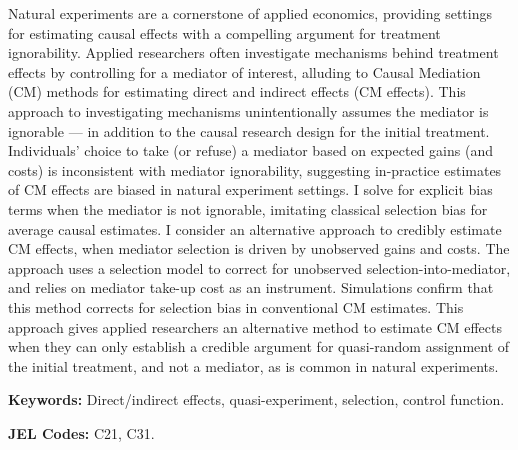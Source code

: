 \noindent
Natural experiments are a cornerstone of applied economics, providing settings for estimating causal effects with a compelling argument for treatment ignorability.
Applied researchers often investigate mechanisms behind treatment effects by controlling for a mediator of interest, alluding to Causal Mediation (CM) methods for estimating direct and indirect effects (CM effects).
This approach to investigating mechanisms unintentionally assumes the mediator is ignorable --- in addition to the causal research design for the initial treatment.
Individuals' choice to take (or refuse) a mediator based on expected gains (and costs) is inconsistent with mediator ignorability, suggesting in-practice estimates of CM effects are biased in natural experiment settings.
I solve for explicit bias terms when the mediator is not ignorable, imitating classical selection bias for average causal estimates.
I consider an alternative approach to credibly estimate CM effects, when mediator selection is driven by unobserved gains and costs.
The approach uses a selection model to correct for unobserved selection-into-mediator, and relies on mediator take-up cost as an instrument.
Simulations confirm that this method corrects for selection bias in conventional CM estimates.
This approach gives applied researchers an alternative method to estimate CM effects when they can only establish a credible argument for quasi-random assignment of the initial treatment, and not a mediator, as is common in natural experiments.

\vspace{0.5cm}
\noindent
\textbf{Keywords:}
Direct/indirect effects, quasi-experiment, selection, control function.

\vspace{0.1cm}
\noindent
\textbf{JEL Codes:}
C21, C31.
